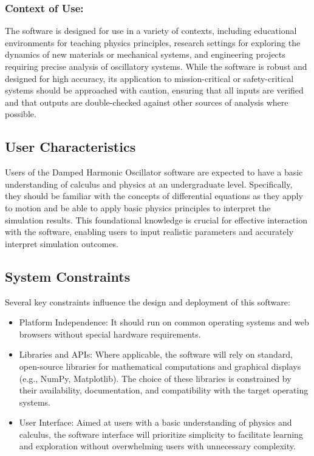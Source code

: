 \documentclass[12pt]{article}
\begin{document}
\subsubsection*{Context of Use:}

The software is designed for use in a variety of contexts, including educational 
environments for teaching physics principles, research settings for exploring 
the dynamics of new materials or mechanical systems, and engineering projects 
requiring precise analysis of oscillatory systems. While the software is robust 
and designed for high accuracy, its application to mission-critical or 
safety-critical systems should be approached with caution, ensuring that all 
inputs are verified and that outputs are double-checked against other sources 
of analysis where possible.

\subsection{User Characteristics} \label{SecUserCharacteristics}

Users of the Damped Harmonic Oscillator software are expected to have a basic 
understanding of calculus and physics at an undergraduate level. Specifically, 
they should be familiar with the concepts of differential equations as they 
apply to motion and be able to apply basic physics principles to interpret 
the simulation results. This foundational knowledge is crucial for effective 
interaction with the software, enabling users to input realistic parameters 
and accurately interpret simulation outcomes.

\subsection{System Constraints}

Several key constraints influence the design and deployment of this software:

\begin{itemize}
  \item Platform Independence: It should run on common operating systems and 
  web browsers without special hardware requirements.
  \item Libraries and APIs: Where applicable, the software will rely on standard, 
  open-source libraries for mathematical computations and graphical displays 
  (e.g., NumPy, Matplotlib). The choice of these libraries is constrained by 
  their availability, documentation, and compatibility with the target operating 
  systems.
  \item User Interface: Aimed at users with a basic understanding of physics and 
  calculus, the software interface will prioritize simplicity to facilitate 
  learning and exploration without overwhelming users with unnecessary complexity.
\end{itemize}
\end{document}

